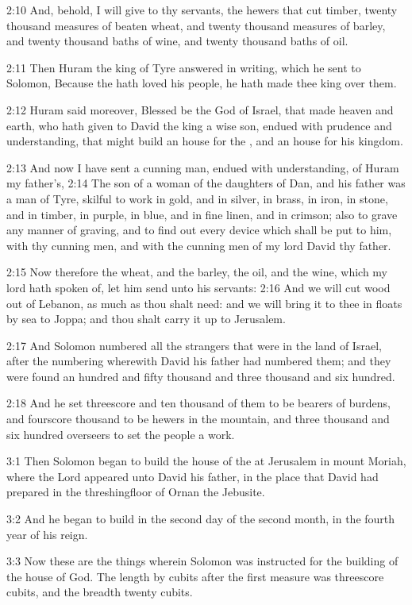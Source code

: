 2:10 And, behold, I will give to thy servants, the hewers that cut timber, twenty thousand measures of beaten wheat, and twenty thousand measures of barley, and twenty thousand baths of wine, and twenty thousand baths of oil.

2:11 Then Huram the king of Tyre answered in writing, which he sent to Solomon, Because the \LORD hath loved his people, he hath made thee king over them.

2:12 Huram said moreover, Blessed be the \LORD God of Israel, that made heaven and earth, who hath given to David the king a wise son, endued with prudence and understanding, that might build an house for the \LORD, and an house for his kingdom.

2:13 And now I have sent a cunning man, endued with understanding, of Huram my father's, 2:14 The son of a woman of the daughters of Dan, and his father was a man of Tyre, skilful to work in gold, and in silver, in brass, in iron, in stone, and in timber, in purple, in blue, and in fine linen, and in crimson; also to grave any manner of graving, and to find out every device which shall be put to him, with thy cunning men, and with the cunning men of my lord David thy father.

2:15 Now therefore the wheat, and the barley, the oil, and the wine, which my lord hath spoken of, let him send unto his servants: 2:16 And we will cut wood out of Lebanon, as much as thou shalt need: and we will bring it to thee in floats by sea to Joppa; and thou shalt carry it up to Jerusalem.

2:17 And Solomon numbered all the strangers that were in the land of Israel, after the numbering wherewith David his father had numbered them; and they were found an hundred and fifty thousand and three thousand and six hundred.

2:18 And he set threescore and ten thousand of them to be bearers of burdens, and fourscore thousand to be hewers in the mountain, and three thousand and six hundred overseers to set the people a work.

3:1 Then Solomon began to build the house of the \LORD at Jerusalem in mount Moriah, where the Lord appeared unto David his father, in the place that David had prepared in the threshingfloor of Ornan the Jebusite.

3:2 And he began to build in the second day of the second month, in the fourth year of his reign.

3:3 Now these are the things wherein Solomon was instructed for the building of the house of God. The length by cubits after the first measure was threescore cubits, and the breadth twenty cubits.

